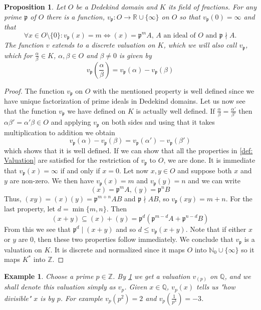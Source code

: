 \documentclass{article}
\newtheorem{proposition}{Proposition}[section]
\newtheorem{example}{Example}[section]
\newcommand{\mfrak}[1]{\mathfrak{#1}}
\newcommand{\mbb}[1]{\mathbb{#1}}
\newcommand{\vp}{{v_{\mfrak p}}}
\numberwithin{equation}{section}
\begin{document}
\begin{proposition} \label{prop: Valuations on Dedekin domains}
    Let $O$ be a Dedekind domain and $K$ its field of fractions. For any prime $\mfrak p$ of $O$ there is a function, $\vp : O \to \mbb R \cup \{\infty \}$ on $O$ so that $\vp(0) = \infty$ and that
    \begin{equation}\label{eq: valuation}
        \forall x \in O\setminus \{0 \}: \vp(x) = m \iff (x) = \mfrak p^m A \text{, $A$ an ideal of $O$ and $\mfrak p \nmid A$}.
    \end{equation}
    The function $v$ extends to a discrete valuation on $K$, which we will also call $\vp$, which for $\frac{\alpha}{\beta} \in K$, $\alpha,\beta \in O$ and $\beta \neq 0$ is given by %
    $$v_\mfrak{p}(\frac{\alpha}{\beta}) = v_\mfrak{p}(\alpha) - v_\mfrak{p}(\beta)$$
\end{proposition}

\begin{proof}
    The function $\vp$ on $O$ with the mentioned property is well defined since we have unique factorization of prime ideals in Dedekind domains. Let us now see that the function $\vp$ we have defined on $K$ is actually well defined. If $\frac{\alpha}{\beta} = \frac{\alpha'}{\beta'}$ then $\alpha\beta' = \alpha'\beta \in O$ and applying $\vp$ on both sides and using that it takes multiplication to addition we obtain
    $$\vp(\alpha) - \vp(\beta) = \vp(\alpha') - \vp(\beta')$$
    which shows that it is well defined. If we can show that all the properties in \cref{def: Valuation} are satisfied for the restriction of $\vp$ to $O$, we are done. It is immediate that $\vp(x) = \infty$ if and only if $x = 0$. Let now $x,y \in O$ and suppose both $x$ and $y$ are non-zero. We then have $\vp (x) = m$ and $\vp (y) = n$ and we can write
    $$(x) = \mfrak{p}^m A, (y) = \mfrak{p}^n B$$
    Thus, $(xy) = (x)(y) = \mfrak{p}^{m+n} AB$ and $\mfrak p \nmid AB$, so $\vp(xy) = m + n$. For the last property, let $d = \min\{m, n\}$. Then
    $$(x + y) \subseteq (x) + (y) = \mfrak p^d (\mfrak p^{m-d} A + \mfrak p^{n-d} B)$$
    From this we see that $\mfrak p^d \mid (x + y)$ and so $d \leq \vp (x+y)$.
    Note that if either $x$ or $y$ are 0, then these two properties follow immediately. We conclude that $\vp$ is a valuation on $K$. It is discrete and normalized since it maps $O$ into $\mbb N_0 \cup \{\infty \}$ so it maps $K^*$ into $\mbb Z$. 
\end{proof}

\begin{example}\label{ex: Almost the p-adic numbers}
    Choose a prime $p \in \mbb Z$. By \cref{prop: Valuations on Dedekin domains} we get a valuation $v_{(p)}$ on $\mbb Q$, and we shall denote this valuation simply as $v_p$. Given $x \in \mbb Q$, $v_p(x)$ tells us "how divisible" $x$ is by $p$. For example $v_p(p^2) = 2$ and $v_p(\frac{1}{p^3}) = -3$.
\end{example}
\end{document}
